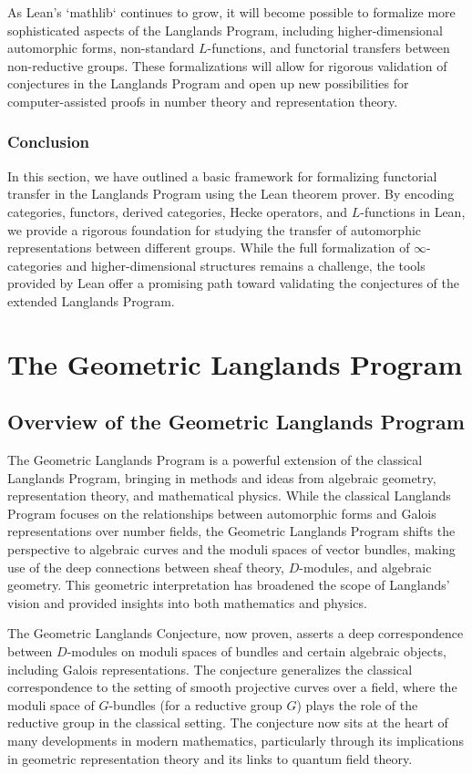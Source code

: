 \documentclass{article}
\theoremstyle{remark}
\begin{document}
As Lean’s `mathlib` continues to grow, it will become possible to formalize more sophisticated aspects of the Langlands Program, including higher-dimensional automorphic forms, non-standard $L$-functions, and functorial transfers between non-reductive groups. These formalizations will allow for rigorous validation of conjectures in the Langlands Program and open up new possibilities for computer-assisted proofs in number theory and representation theory.

\subsubsection{Conclusion}

In this section, we have outlined a basic framework for formalizing functorial transfer in the Langlands Program using the Lean theorem prover. By encoding categories, functors, derived categories, Hecke operators, and $L$-functions in Lean, we provide a rigorous foundation for studying the transfer of automorphic representations between different groups. While the full formalization of $\infty$-categories and higher-dimensional structures remains a challenge, the tools provided by Lean offer a promising path toward validating the conjectures of the extended Langlands Program.


\section{The Geometric Langlands Program}

\subsection{Overview of the Geometric Langlands Program}

The Geometric Langlands Program is a powerful extension of the classical Langlands Program, bringing in methods and ideas from algebraic geometry, representation theory, and mathematical physics. While the classical Langlands Program focuses on the relationships between automorphic forms and Galois representations over number fields, the Geometric Langlands Program shifts the perspective to algebraic curves and the moduli spaces of vector bundles, making use of the deep connections between sheaf theory, $D$-modules, and algebraic geometry. This geometric interpretation has broadened the scope of Langlands' vision and provided insights into both mathematics and physics.

The Geometric Langlands Conjecture, now proven, asserts a deep correspondence between $D$-modules on moduli spaces of bundles and certain algebraic objects, including Galois representations. The conjecture generalizes the classical correspondence to the setting of smooth projective curves over a field, where the moduli space of $G$-bundles (for a reductive group $G$) plays the role of the reductive group in the classical setting. The conjecture now sits at the heart of many developments in modern mathematics, particularly through its implications in geometric representation theory and its links to quantum field theory.
\end{document}
